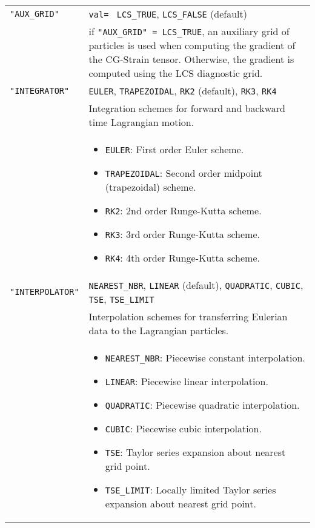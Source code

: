 \documentclass[letterpaper,11pt]{article}
\begin{document}
\begin{longtable}{p{}p{}}
\verb|"AUX_GRID"| & \verb|val= | \verb|LCS_TRUE|, \verb|LCS_FALSE| (default)\\
& if \verb|"AUX_GRID" = LCS_TRUE|, an auxiliary grid of particles is used when computing the gradient of the CG-Strain tensor.  Otherwise, the gradient is computed using the LCS diagnostic grid.\\
\verb|"INTEGRATOR"|&\verb|EULER|, \verb|TRAPEZOIDAL|, \verb|RK2| (default), \verb|RK3|, \verb|RK4|\\
& Integration schemes for forward and backward time Lagrangian motion.\\
&\begin{itemize}
  \item \verb|EULER|: First order Euler scheme.
  \item \verb|TRAPEZOIDAL|: Second order midpoint (trapezoidal) scheme.
  \item \verb|RK2|: 2nd order Runge-Kutta scheme. 
  \item \verb|RK3|: 3rd order Runge-Kutta scheme.
  \item \verb|RK4|: 4th order Runge-Kutta scheme. 
 \end{itemize}\\
\verb|"INTERPOLATOR"| & \verb|NEAREST_NBR|, \verb|LINEAR| (default), \verb|QUADRATIC|, \verb|CUBIC|, \verb|TSE|, \verb|TSE_LIMIT|\\
&Interpolation schemes for transferring Eulerian data to the Lagrangian particles. \\
&\begin{itemize}
 \item \verb|NEAREST_NBR|: Piecewise constant interpolation.
 \item \verb|LINEAR|: Piecewise linear interpolation.
 \item \verb|QUADRATIC|: Piecewise quadratic interpolation.
 \item \verb|CUBIC|: Piecewise cubic interpolation.
 \item \verb|TSE|: Taylor series expansion about nearest grid point.
 \item \verb|TSE_LIMIT|: Locally limited Taylor series expansion about nearest grid point.
\end{itemize}\\
\hline
\end{longtable}
\end{document}
